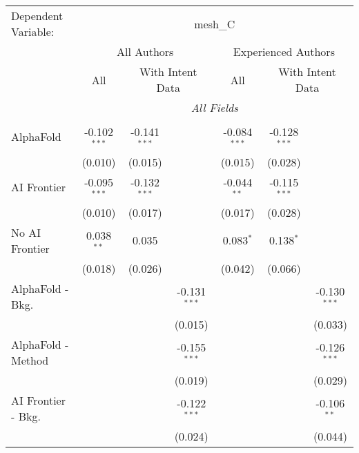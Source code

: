 \begingroup
\centering
\begin{tabular}{lcccccc}
   \tabularnewline \midrule \midrule
   Dependent Variable: & \multicolumn{6}{c}{mesh\_C}\\
 & \multicolumn{3}{c}{All Authors} & \multicolumn{3}{c}{Experienced Authors} \\
\cmidrule(lr){2-4} \cmidrule(lr){5-7}
 & \multicolumn{1}{c}{All} & \multicolumn{2}{c}{With Intent Data} & \multicolumn{1}{c}{All} & \multicolumn{2}{c}{With Intent Data} \\
\cmidrule(lr){2-2} \cmidrule(lr){3-4} \cmidrule(lr){5-5} \cmidrule(lr){6-7}
 & \multicolumn{6}{c}{\textit{All Fields}} \\ \\
   AlphaFold               & -0.102$^{***}$ & -0.141$^{***}$ &                & -0.084$^{***}$ & -0.128$^{***}$ &   \\   
                           & (0.010)        & (0.015)        &                & (0.015)        & (0.028)        &   \\   
   AI Frontier             & -0.095$^{***}$ & -0.132$^{***}$ &                & -0.044$^{**}$  & -0.115$^{***}$ &   \\   
                           & (0.010)        & (0.017)        &                & (0.017)        & (0.028)        &   \\   
   No AI Frontier          & 0.038$^{**}$   & 0.035          &                & 0.083$^{*}$    & 0.138$^{*}$    &   \\   
                           & (0.018)        & (0.026)        &                & (0.042)        & (0.066)        &   \\   
   AlphaFold - Bkg.        &                &                & -0.131$^{***}$ &                &                & -0.130$^{***}$\\   
                           &                &                & (0.015)        &                &                & (0.033)\\   
   AlphaFold - Method      &                &                & -0.155$^{***}$ &                &                & -0.126$^{***}$\\   
                           &                &                & (0.019)        &                &                & (0.029)\\   
   AI Frontier - Bkg.      &                &                & -0.122$^{***}$ &                &                & -0.106$^{**}$\\   
                           &                &                & (0.024)        &                &                & (0.044)\\   

\end{tabular}
